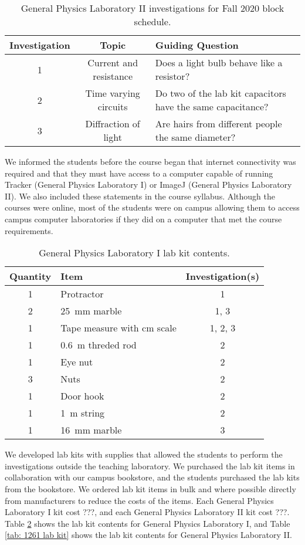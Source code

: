 \documentclass[aip, numerical, preprint]{revtex4-2}
\begin{document}
\begin{table}
  \caption{\label{tab: 1261 fall} General Physics Laboratory II investigations for Fall 2020
    block schedule.}
  \begin{ruledtabular}
    \begin{tabular}{ccp{26em}}
      Investigation & Topic & Guiding Question\\
      \hline
      1 & Current and resistance & Does a light bulb behave like a resistor? \\
      2 & Time varying circuits & Do two of the lab kit capacitors have the same capacitance? \\
      3 & Diffraction of light & Are hairs from different people the same diameter?
    \end{tabular}
  \end{ruledtabular}
\end{table}

We informed the students before the course began that internet connectivity was required and
that they must have access to a computer capable of running Tracker (General Physics Laboratory
I) or ImageJ (General Physics Laboratory II). We also included these statements in the course
syllabus. Although the courses were online, most of the students were on campus allowing them
to access campus computer laboratories if they did on a computer that met the course
requirements.
  
\begin{table}
  \caption{\label{tab: 1251 lab kit} General Physics Laboratory I lab kit contents.}
  \begin{tabular}{clc}
    \hline\hline
    Quantity & Item & Investigation(s)\\
    \hline
    1 & Protractor & 1 \\
    2 & \SI{25}{mm} marble & 1, 3 \\
    1 & Tape measure with cm scale & 1, 2, 3\\
    1 & \SI{0.6}{m} threded rod & 2 \\
    1 & Eye nut & 2 \\
    3 & Nuts & 2 \\
    1 & Door hook & 2 \\
    1 & \SI{1}{m} string & 2 \\
    1 & \SI{16}{mm} marble & 3 \\
    \hline\hline
  \end{tabular}
\end{table}

We developed lab kits with supplies that allowed the students to perform the investigations
outside the teaching laboratory. We purchased the lab kit items in collaboration with our
campus bookstore, and the students purchased the lab kits from the bookstore. We ordered lab
kit items in bulk and where possible directly from manufacturers to reduce the costs of the
items. Each General Physics Laboratory I kit cost ???, and each General Physics Laboratory II
kit cost ???. Table \ref{tab: 1251 lab kit} shows the lab kit contents for General Physics
Laboratory I, and Table \ref{tab: 1261 lab kit} shows the lab kit contents for General Physics
Laboratory II.
\end{document}
